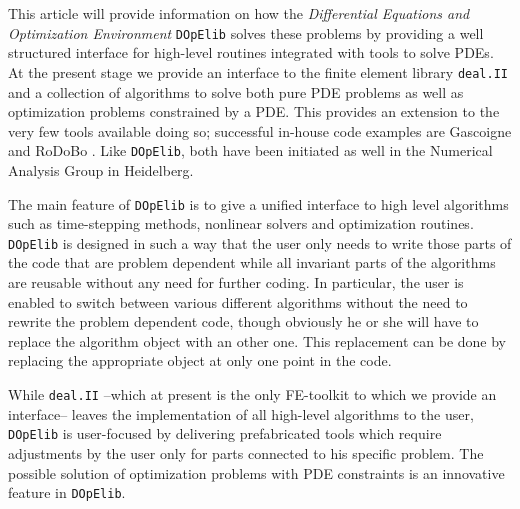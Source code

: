 \documentclass[smallextended]{svjour3}       %
\numberwithin{equation}{section}
\newcommand{\deal}{\texttt{deal.II}}
\newcommand{\dope}{\texttt{DOpElib}}
\begin{document}
This article will provide information on how the {\em Differential 
Equations and Optimization Environment} \dope{}  \cite{dope} 
solves these problems by providing a well structured interface for high-level 
routines integrated
with tools to solve PDEs. At the present stage we provide an interface to 
the finite element library \deal{} and a collection of algorithms to solve
both pure PDE problems as well as optimization problems 
constrained by a PDE. 
This provides an extension to the 
very few tools available doing so; 
successful in-house code examples are Gascoigne \cite{gascoigne}
and RoDoBo \cite{rodobo}. 
Like \dope{}, both have been initiated as well in 
the Numerical Analysis Group in Heidelberg.

The main feature of \dope{} is to give a unified interface to high level 
algorithms such as 
time-stepping methods, nonlinear solvers and optimization routines. 
\dope{} is designed in such a way that the user only needs to write those parts
of the code that are problem dependent while all invariant 
parts of the algorithms
are reusable without any need for further coding.
In particular, the user is enabled to switch between various different 
algorithms without the need to rewrite the problem dependent code, 
though obviously he or she will
have to replace the algorithm object with an other one. 
This replacement can be done by replacing the appropriate object at only
one point in the code.

While \deal{} --which at present is the only FE-toolkit to which we provide an 
interface-- leaves the implementation of all high-level algorithms to the user, 
\dope{} is user-focused by delivering
prefabricated tools which require adjustments by the user only for parts
connected to his specific problem. The possible solution of 
optimization problems with PDE constraints is an innovative feature in \dope{}.
\end{document}
